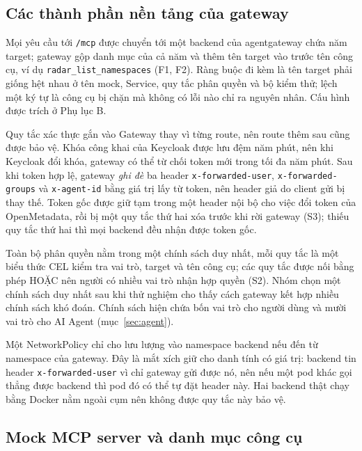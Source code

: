 \subsection{Các thành phần nền tảng của gateway}\label{sec:netpol}

Mọi yêu cầu tới \texttt{/mcp} được chuyển tới một backend của agentgateway chứa năm target; gateway gộp danh mục của cả năm và thêm tên target vào trước tên công cụ, ví dụ \texttt{radar\_list\_namespaces} (F1, F2). Ràng buộc đi kèm là tên target phải giống hệt nhau ở tên mock, Service, quy tắc phân quyền và bộ kiểm thử; lệch một ký tự là công cụ bị chặn mà không có lỗi nào chỉ ra nguyên nhân. Cấu hình được trích ở Phụ lục B.

Quy tắc xác thực gắn vào Gateway thay vì từng route, nên route thêm sau cũng được bảo vệ. Khóa công khai của Keycloak được lưu đệm năm phút, nên khi Keycloak đổi khóa, gateway có thể từ chối token mới trong tối đa năm phút. Sau khi token hợp lệ, gateway \emph{ghi đè} ba header \texttt{x-forwarded-user}, \texttt{x-forwarded-groups} và \texttt{x-agent-id} bằng giá trị lấy từ token, nên header giả do client gửi bị thay thế. Token gốc được giữ tạm trong một header nội bộ cho việc đổi token của OpenMetadata, rồi bị một quy tắc thứ hai xóa trước khi rời gateway (S3); thiếu quy tắc thứ hai thì mọi backend đều nhận được token gốc.

Toàn bộ phân quyền nằm trong một chính sách duy nhất, mỗi quy tắc là một biểu thức CEL kiểm tra vai trò, target và tên công cụ; các quy tắc được nối bằng phép HOẶC nên người có nhiều vai trò nhận hợp quyền (S2). Nhóm chọn một chính sách duy nhất sau khi thử nghiệm cho thấy cách gateway kết hợp nhiều chính sách khó đoán. Chính sách hiện chứa bốn vai trò cho người dùng và mười vai trò cho AI Agent (mục~\ref{sec:agent}).

Một NetworkPolicy chỉ cho lưu lượng vào namespace backend nếu đến từ namespace của gateway. Đây là mắt xích giữ cho danh tính có giá trị: backend tin header \texttt{x-forwarded-user} vì chỉ gateway gửi được nó, nên nếu một pod khác gọi thẳng được backend thì pod đó có thể tự đặt header này. Hai backend thật chạy bằng Docker nằm ngoài cụm nên không được quy tắc này bảo vệ.

\subsection{Mock MCP server và danh mục công cụ}

